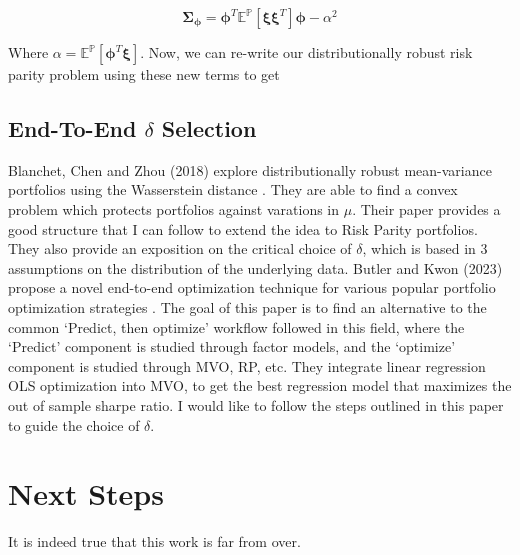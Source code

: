 \documentclass[12pt]{article}
\begin{document}
\[
	\boldsymbol{\Sigma_\phi} = \boldsymbol{\phi}^T \mathbb{E}^{\mathbb{P}}[\boldsymbol{\xi} \boldsymbol{\xi} ^T] \boldsymbol{\phi} - \alpha^2
\]

Where $\alpha = \mathbb{E}^{\mathbb{P}}[\boldsymbol{\phi}^T \boldsymbol{\xi}]$.  Now, we can re-write our distributionally robust risk parity problem using these new terms to get




\subsection{End-To-End $\delta$ Selection}

Blanchet, Chen and Zhou (2018) explore distributionally robust mean-variance portfolios using the Wasserstein distance \cite{blanchet2022distributionally}. They are able to find a convex problem which protects portfolios against varations in $\mu$.  Their paper provides a good structure that I can follow to extend the idea to Risk Parity portfolios.  They also provide an exposition on the critical choice of $\delta$, which is based in 3 assumptions on the distribution of the underlying data.  Butler and Kwon (2023) propose a novel end-to-end optimization technique for various popular portfolio optimization strategies \cite{butler2023integrating}. The goal of this paper is to find an alternative to the common `Predict, then optimize' workflow followed in this field, where the `Predict' component is studied through factor models, and the `optimize' component is studied through MVO, RP, etc. They integrate linear regression OLS optimization into MVO, to get the best regression model that maximizes the out of sample sharpe ratio.  I would like to follow the steps outlined in this paper to guide the choice of $\delta$.


\newpage
\section{Next Steps}

It is indeed true that this work is far from over.

\newpage




\end{document}
